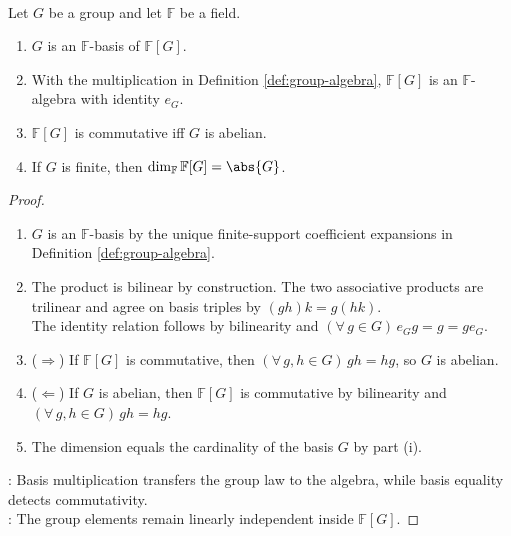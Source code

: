 \begin{proposition} \label{prop:group-algebra-structure} \\
Let $G$ be a group and let $\mathbb{F}$ be a field.
\begin{enumerate}[label=(\roman*)]
\setlength{\itemsep}{0pt}
\item $G$ is an $\mathbb{F}$-basis of $\mathbb{F}[G]$.
\item With the multiplication in Definition \ref{def:group-algebra}, $\mathbb{F}[G]$ is an $\mathbb{F}$-algebra with identity $e_G$.
\item $\mathbb{F}[G]$ is commutative iff $G$ is abelian.
\item If $G$ is finite, then $\dim_{\mathbb{F}}\mathbb{F}[G]=\abs{G}$.
\end{enumerate}
\begin{proof}
\begin{enumerate}[label=(\roman*)]
\setlength{\itemsep}{0pt}
\item[$(i)$] $G$ is an $\mathbb{F}$-basis by the unique finite-support coefficient expansions in Definition \ref{def:group-algebra}.
\item[$(ii)$] The product is bilinear by construction. The two associative products are trilinear and agree on basis triples by $(gh)k=g(hk)$.\\
The identity relation follows by bilinearity and $(\forall\,g\in G)\,e_Gg=g=ge_G$.
\item[$(iii)$] ($\Rightarrow$) If $\mathbb{F}[G]$ is commutative, then $(\forall\,g,h\in G)\,gh=hg$, so $G$ is abelian.
\item[$(iii)$] ($\Leftarrow$) If $G$ is abelian, then $\mathbb{F}[G]$ is commutative by bilinearity and $(\forall\,g,h\in G)\,gh=hg$.
\item[$(iv)$] The dimension equals the cardinality of the basis $G$ by part (i).
\end{enumerate}
: Basis multiplication transfers the group law to the algebra, while basis equality detects commutativity.\\
: The group elements remain linearly independent inside $\mathbb{F}[G]$.
\end{proof}
\end{proposition}

